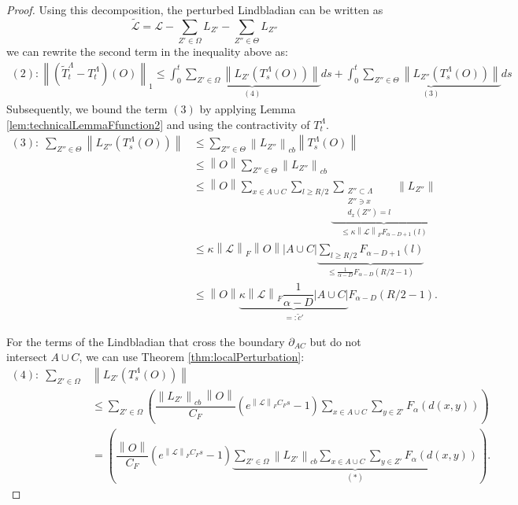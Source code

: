 \documentclass[10pt,a4paper]{amsart}
\newcommand{\LL}{\widetilde{\Li}}
\newcommand{\La}{\Lambda}
\newcommand{\Li}{\mathcal{L}}
\newcommand{\T}{T^\Lambda}
\newcommand{\TT}{\widetilde{T}^\Lambda}
\newcommand{\abs}[1]{\left \vert#1\right\vert}
\newcommand{\norm}[1]{\left\lVert#1\right\rVert}
\newcommand{\normm}[2]{\left\lVert#1\right\rVert_{#2}}
\begin{document}
\begin{proof}
    Using this decomposition, the perturbed Lindbladian can be written as
     \begin{equation}
         \LL=\Li -\sum_{Z'\in \Omega}L_{Z'}-\sum_{Z''\in \Theta}L_{Z''}
     \end{equation}
    we can rewrite the second term in the inequality above as:
     \begin{multline}
        (2):\normm{(\TT_t-\T_t)(O)}{1}\leq \int_0^t\underbrace{\sum_{Z'\in \Omega} \norm{L_{Z'}(\T_s(O))}}_{(4)}ds+\int_0^t\underbrace{\sum_{Z''\in \Theta} \norm{L_{Z''}(\T_s(O))}}_{(3)}ds
        \label{eq:(2)}
     \end{multline}
 Subsequently, we bound the term $(3)$ by applying Lemma \ref{lem:technicalLemmaFfunction2} and using the contractivity of $\T_t$.  
\begin{align}
(3):\;\sum_{Z''\in \Theta} \norm{L_{Z''}(\T_s(O))} &\le \sum_{Z''\in \Theta} \normm{L_{Z''}}{cb}\norm{\T_s(O)} \\
&\le \norm{O}\sum_{Z''\in \Theta} \normm{L_{Z''}}{cb} \nonumber\\
&\le \norm{O}\sum_{x\in A\cup C}\sum_{l\ge R/2}\underbrace{\sum_{\substack{Z''\subset \La \\ Z''\ni x \\ d_x(Z'')=l}}\norm{L_{Z''}}}_{\le \kappa \normm{\Li}{F} F_{\alpha-D+1}(l)} \nonumber\\
&\le \kappa \normm{\Li}{F}\norm{O}\abs{A\cup C}\underbrace{\sum_{l\ge R/2} F_{\alpha-D+1}(l)}_{\le \frac{1}{\alpha-D}F_{\alpha-D}(R/2-1)} \nonumber\\
&\le \norm{O}\underbrace{\kappa \normm{\Li}{F}\dfrac{1}{\alpha-D}\abs{A\cup C}}_{=:\tilde{c}'} F_{\alpha-D}(R/2-1). \nonumber
\end{align}
     
     For the terms of the Lindbladian that cross the boundary $\partial_{AC}$ but do not intersect $A\cup C$, we can use Theorem \ref{thm:localPerturbation}:
    \begin{align}
    (4):\;\sum_{Z'\in \Omega} & \norm{L_{Z'}(\T_s(O))}\nonumber \\
    &\nonumber \le \sum_{Z'\in \Omega}\left( \dfrac{\normm{L_{Z'}}{cb}\,\norm{O}}{C_F}\left( e^{\normm{\Li}{F} C_F s}-1\right)\sum_{x\in A\cup C}\sum_{y\in Z'}F_\alpha(d(x,y))\right) \\
    &= \left( \dfrac{\norm{O}}{C_F}\left( e^{\normm{\Li}{F} C_F s}-1\right)\underbrace{\sum_{Z'\in \Omega}\normm{L_{Z'}}{cb}\sum_{x\in A\cup C}\sum_{y\in Z'}F_\alpha(d(x,y))}_{(*)}\right).
    \label{eq:termsCrossingBoundary}
    \end{align}
    

\end{proof}
\end{document}
